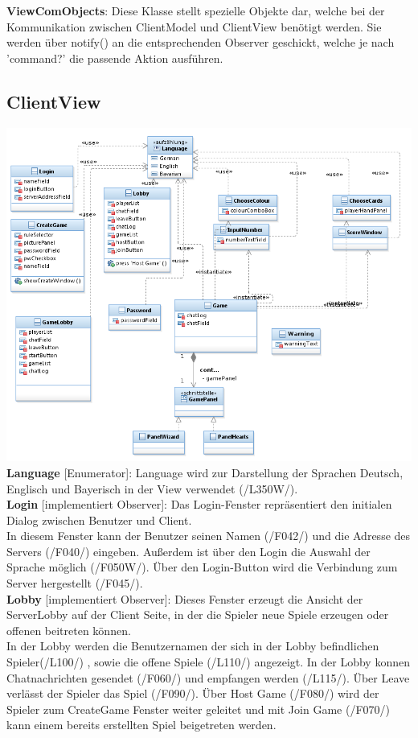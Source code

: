 \documentclass{article}
\begin{document}
\textbf{ViewComObjects}: Diese Klasse stellt spezielle Objekte dar, welche bei der Kommunikation zwischen ClientModel und ClientView benötigt werden. Sie werden über notify() an die entsprechenden Observer geschickt, welche je nach 'command?' die passende Aktion ausführen.

\subsection{ClientView}
\includegraphics[width=\textwidth]{ClientView}
\textbf{Language} [Enumerator]: Language wird zur Darstellung der Sprachen Deutsch, Englisch und Bayerisch  in der View verwendet (/L350W/). \\

\textbf{Login} [implementiert Observer]: Das Login-Fenster repräsentiert den initialen Dialog zwischen Benutzer und Client.\\
In diesem Fenster kann der Benutzer seinen Namen (/F042/) und die Adresse des Servers (/F040/) eingeben. Außerdem ist über den Login die Auswahl der Sprache möglich (/F050W/). Über den Login-Button wird die Verbindung zum Server hergestellt (/F045/).\\

\textbf{Lobby} [implementiert Observer]: Dieses Fenster erzeugt die Ansicht der ServerLobby auf der Client Seite, in der die Spieler neue Spiele erzeugen oder offenen beitreten können.\\
In der Lobby werden die Benutzernamen der sich in der Lobby befindlichen Spieler(/L100/) , sowie die  offene Spiele (/L110/) angezeigt. In der Lobby konnen Chatnachrichten gesendet (/F060/) und empfangen werden (/L115/). Über Leave verlässt der Spieler das Spiel (/F090/). Über Host Game (/F080/) wird der Spieler zum CreateGame Fenster weiter geleitet und mit Join Game (/F070/) kann einem bereits erstellten Spiel beigetreten werden. \\
\end{document}

